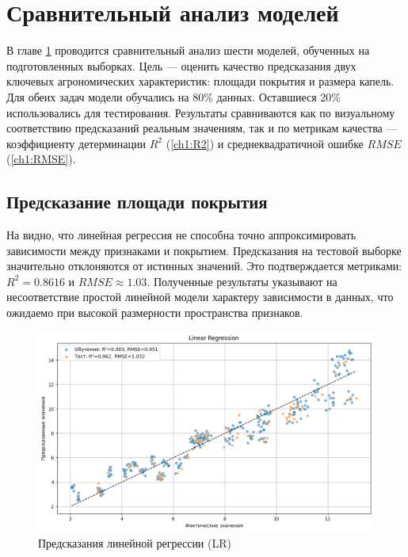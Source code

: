\chapter{Сравнительный анализ моделей}\label{ch3}

В главе \ref{ch3} проводится сравнительный анализ шести моделей, обученных на подготовленных выборках. Цель --- оценить качество предсказания двух ключевых агрономических характеристик: площади покрытия и размера капель. Для обеих задач модели обучались на 80\% данных. Оставшиеся 20\% использовались для тестирования. Результаты сравниваются как по визуальному соответствию предсказаний реальным значениям, так и по метрикам качества --- коэффициенту детерминации $R^2$ (\ref{ch1:R2}) и среднеквадратичной ошибке $RMSE$ (\ref{ch1:RMSE}).

\section{Предсказание площади покрытия}\label{ch3:coverage}

На  видно, что линейная регрессия не способна точно аппроксимировать зависимости между признаками и покрытием. Предсказания на тестовой выборке значительно отклоняются от истинных значений. Это подтверждается метриками: $R^2 = 0.8616$ и $RMSE \approx 1.03$. Полученные результаты указывают на несоответствие простой линейной модели характеру зависимости в данных, что ожидаемо при высокой размерности пространства признаков.

\begin{figure}[htbp!]
	\centering
	\includegraphics[width=.9\linewidth]{my_folder/images/coverage/Linear-Regression.png}
	\caption{Предсказания линейной регрессии (LR)} 
	\label{fig:coverage-lr}  
\end{figure}

